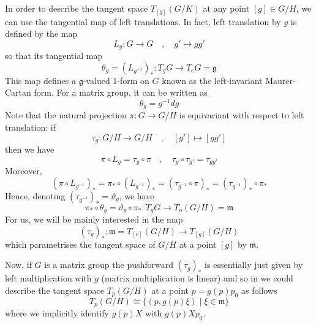 \documentclass[a4paper,11pt]{article}
\theoremstyle{definition}
\newcommand{\g}{\mathfrak{g}}
\newcommand{\m}{\mathfrak{m}}
\begin{document}
In order to describe the tangent space $T_{[g]}(G/K)$ at any point $[g] \in G/H$, we can use the tangential map of left translations. 
In fact, left translation by $g$ is defined by the map
\begin{equation}
  L_g \colon G \to G \quad , \quad g' \mapsto g g'
\end{equation}
so that its tangential map
\begin{equation}
  \theta_g = (L_{g^{-1}})_* \colon T_g G \to T_e G = \g
\end{equation}
This map defines a $\g$-valued 1-form on $G$ known as the left-invariant Maurer-Cartan form. 
For a matrix group, it can be written as 
\begin{equation}
  \theta_g = g^{-1}dg
\end{equation}
Note that the natural projection $\pi \colon G \to G/H$ is equivariant with respect to left translation: if 
\begin{equation}
  \tau_g \colon G/H \to G/H \quad , \quad [g'] \mapsto [gg']
\end{equation}
then we have
\begin{equation}
  \pi \circ L_g = \tau_g \circ \pi \quad , \quad \tau_g\circ\tau_{g'} = \tau_{gg'}
\end{equation}
Moreover, 
\begin{equation}
  (\pi\circ L_{g^{-1}})_* = \pi_* \circ (L_{g^{-1}})_* = (\tau_{g^{-1}} \circ \pi)_* = (\tau_{g^{-1}})_* \circ \pi_*
\end{equation}
Hence, denoting $(\tau_{g^{-1}})_* = \vartheta_g$, we have
\begin{equation}
  \pi_* \circ \theta_g = \vartheta_g \circ \pi_* \colon T_g G \to T_{o}(G/H) = \m
\end{equation}
For us, we will be mainly interested in the map
\begin{equation}
  (\tau_g)_* \colon \m = T_{[e]}(G/H) \to T_{[g]}(G/H)
\end{equation}
which parametrises the tangent space of $G/H$ at a point $[g]$ by $\m$.

Now, if $G$ is a matrix group the pushforward $(\tau_g)_*$ is essentially just given by left multiplication with $g$ (matrix multiplication is linear) and so in we could describe the tangent space $T_p(G/H)$ at a point $p = g(p) p_0$ as follows
\begin{equation}
  T_p(G/H) \cong \{ (p,g(p) \xi) \mid \xi \in \m \} 
\end{equation}
where we implicitly identify $g(p) X$ with $g(p) X p_0$.
\end{document}
